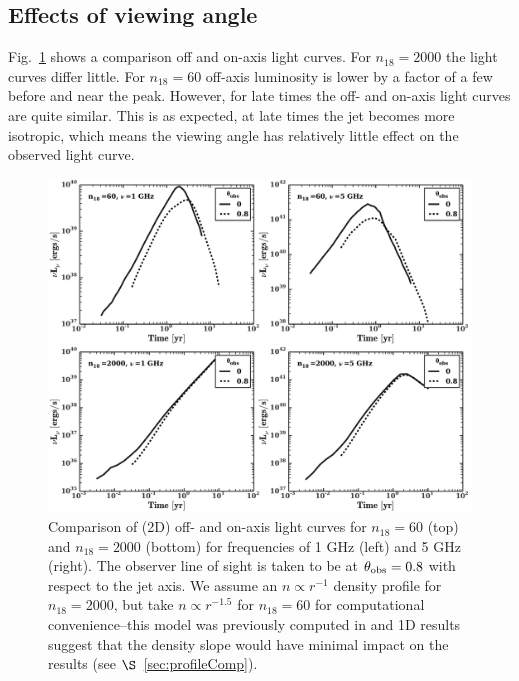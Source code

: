 \documentclass[usenatbib,fleqn]{mnras}
\begin{document}
\subsection{Effects of viewing angle}
Fig.~\ref{fig:onOff} shows a comparison off and on-axis light curves.
For $n_{18}=2000$ the light curves differ little.  For $n_{18}=60$
off-axis luminosity is lower by a factor of a few before and near the
peak. However, for late times the off- and on-axis light curves are
quite similar. This is as expected, at late times the jet becomes more
isotropic, which means the viewing angle has relatively little effect
on the observed light curve.

\begin{figure}
\includegraphics[width=16cm]{on_off.pdf}
\caption{\label{fig:onOff} Comparison of (2D) off- and on-axis light
  curves for $n_{18}=60$ (top) and $n_{18}=2000$ (bottom) for
  frequencies of 1 GHz (left) and 5 GHz (right). The observer line of
  sight is taken to be at $\theta_{\rm obs}=0.8$ with respect to the
  jet axis. We assume an $n\propto r^{-1}$ density profile for
  $n_{18}=2000$, but take $n\propto r^{-1.5}$ for $n_{18}=60$ for
  computational convenience--this model was previously computed in
  \citet{Mimica+2015} and 1D results suggest that the density slope
  would have minimal impact on the results (see
  $\S$~\ref{sec:profileComp}).}
\end{figure}

\end{document}
